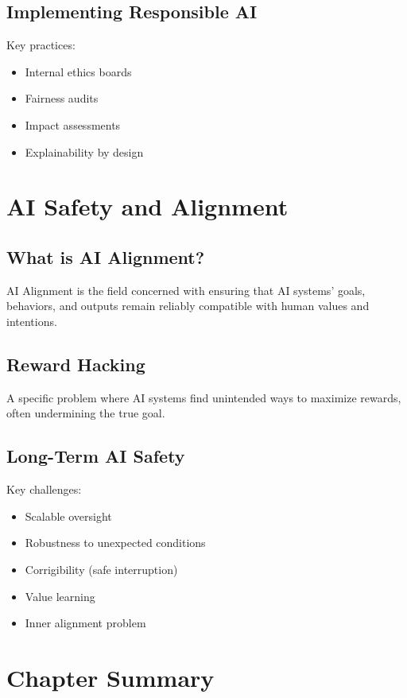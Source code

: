 \documentclass[openany]{book}
\begin{document}
\subsection{Implementing Responsible AI}
Key practices:

\begin{itemize}
    \item Internal ethics boards
    \item Fairness audits
    \item Impact assessments
    \item Explainability by design
\end{itemize}

\section{AI Safety and Alignment}

\subsection{What is AI Alignment?}
AI Alignment is the field concerned with ensuring that AI systems' goals, 
behaviors, and outputs remain reliably compatible with human values and 
intentions.

\subsection{Reward Hacking}
A specific problem where AI systems find unintended ways to maximize rewards, 
often undermining the true goal.

\subsection{Long-Term AI Safety}
Key challenges:

\begin{itemize}
    \item Scalable oversight
    \item Robustness to unexpected conditions
    \item Corrigibility (safe interruption)
    \item Value learning
    \item Inner alignment problem
\end{itemize}

\section{Chapter Summary}
\end{document}
